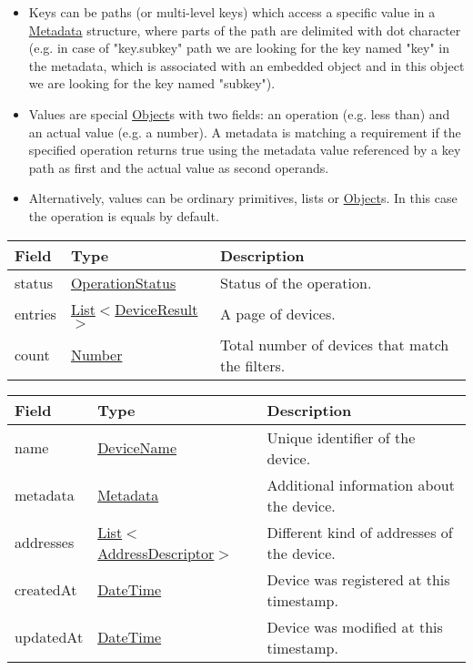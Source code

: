\documentclass[a4paper]{arrowhead}
\newcommand{\pref}[1]{{\textcolor{ArrowheadGrey}{\hyperref[sec:model:primitives:#1]{#1}}}}
\begin{document}
\begin{itemize}
    \item Keys can be paths (or multi-level keys) which access a specific value in a \hyperref[sec:model:Metadata]{Metadata} structure, where parts of the path are delimited with dot character (e.g. in case of "key.subkey" path we are looking for the key named "key" in the metadata, which is associated with an embedded object and in this object we are looking for the key named "subkey").
    \item Values are special \pref{Object}s with two fields: an operation (e.g. less than) and an actual value (e.g. a number). A metadata is matching a requirement if the specified operation returns true using the metadata value referenced by a key path as first and the actual value as second operands. 
    \item Alternatively, values can be ordinary primitives, lists or \pref{Object}s. In this case the operation is equals by default.
\end{itemize}


\begin{table}[ht!]
\begin{tabularx}{\textwidth}{| p{2.5cm} | p{3.1cm} | X |} \hline
\rowcolor{gray!33} Field & Type      & Description \\ \hline
status & \pref{OperationStatus} & Status of the operation. \\ \hline
entries & \pref{List}$<$\hyperref[sec:model:DeviceResult]{DeviceResult}$>$ & A page of devices. \\ \hline
count & \pref{Number} & Total number of devices that match the filters. \\ \hline
\end{tabularx}
\end{table}

 
\begin{table}[ht!]
\begin{tabularx}{\textwidth}{| p{2.5cm} | p{4cm} | X |} \hline
\rowcolor{gray!33} Field & Type      & Description \\ \hline
name & \pref{DeviceName} & Unique identifier of the device. \\ \hline
metadata & \hyperref[sec:model:Metadata]{Metadata} & Additional information about the device. \\ \hline
addresses &  \pref{List}$<$\hyperref[sec:model:AddressDescriptor]{AddressDescriptor}$>$ & Different kind of addresses of the device.  \\ \hline
createdAt & \pref{DateTime} & Device was registered at this timestamp. \\ \hline
updatedAt & \pref{DateTime} & Device was modified at this timestamp. \\ \hline
\end{tabularx}
\end{table}
\end{document}
